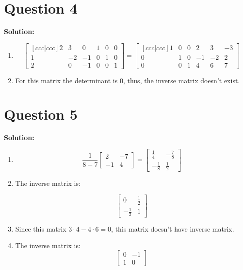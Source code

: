 \documentclass[11pt]{article} %
\begin{document}
\section{Question 4}
\textbf{Solution:}

\begin{enumerate}
	\item 
	$$\begin{bmatrix}[ccc|ccc]
		2&3&0&1&0&0\\
		1&-2&-1&0&1&0\\
		2&0&-1&0&0&1
	\end{bmatrix}=
\begin{bmatrix}[ccc|ccc]
	1&0&0&2&3&-3\\
	0&1&0&-1&-2&2\\
	0&0&1&4&6&7
\end{bmatrix}$$
\item 
For this matrix the determinant is 0, thus, the inverse matrix doesn't exist. 

\end{enumerate}
	
\section{Question 5}
\textbf{Solution:}
\begin{enumerate}
	
\item 
$$ \frac{1}{8-7}
\begin{bmatrix}
	2&-7\\
	-1&4
\end{bmatrix}=\begin{bmatrix}
\frac{1}{4}&-\frac{7}{8}\\
-\frac{1}{8}&\frac{1}{2}
\end{bmatrix}$$
\item 
The inverse matrix is:

$$\begin{bmatrix}
	0&\frac{1}{2}\\
	-\frac{1}{2}&1
\end{bmatrix}$$

\item Since this matrix $3\cdot 4-4\cdot 6=0$, this matrix doesn't have inverse matrix. 

\item The inverse matrix is:
$$\begin{bmatrix}
	0 &-1\\
	1&0
\end{bmatrix}$$


\end{enumerate}
\end{document}

